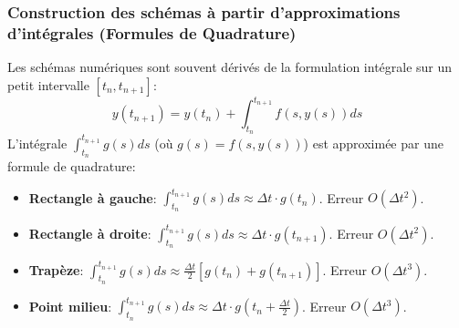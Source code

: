 \subsubsection{Construction des schémas à partir d'approximations d'intégrales (Formules de Quadrature)}
\label{sssec:quadrature}
Les schémas numériques sont souvent dérivés de la formulation intégrale sur un petit intervalle $[t_n, t_{n+1}]$:
\[ y(t_{n+1}) = y(t_n) + \int_{t_n}^{t_{n+1}} f(s, y(s)) ds \]
L'intégrale $\int_{t_n}^{t_{n+1}} g(s) ds$ (où $g(s) = f(s, y(s))$) est approximée par une formule de quadrature:
\begin{itemize}
    \item \textbf{Rectangle à gauche}: $\int_{t_n}^{t_{n+1}} g(s) ds \approx \Delta t \cdot g(t_n)$. Erreur $O(\Delta t^2)$.
    \item \textbf{Rectangle à droite}: $\int_{t_n}^{t_{n+1}} g(s) ds \approx \Delta t \cdot g(t_{n+1})$. Erreur $O(\Delta t^2)$.
    \item \textbf{Trapèze}: $\int_{t_n}^{t_{n+1}} g(s) ds \approx \frac{\Delta t}{2} [g(t_n) + g(t_{n+1})]$. Erreur $O(\Delta t^3)$.
    \item \textbf{Point milieu}: $\int_{t_n}^{t_{n+1}} g(s) ds \approx \Delta t \cdot g(t_n + \frac{\Delta t}{2})$. Erreur $O(\Delta t^3)$.
\end{itemize}

